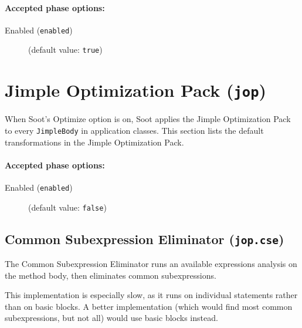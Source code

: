 \documentclass{article}
\begin{document}
\paragraph{Accepted phase options:} 

\begin{description}

\item[Enabled ({\tt enabled})]
(default value: {\tt true})






\end{description}

\section{Jimple Optimization Pack ({\tt jop})}

When Soot's Optimize option is on, Soot applies the
Jimple Optimization Pack to every {\tt JimpleBody} in
application classes.  This section lists the default
transformations in the Jimple Optimization Pack.


\paragraph{Accepted phase options:} 

\begin{description}

\item[Enabled ({\tt enabled})]
(default value: {\tt false})






\end{description}

\subsection{Common Subexpression Eliminator ({\tt jop.cse})}


\par

The Common Subexpression Eliminator runs an available expressions
analysis on the method body, then eliminates common
subexpressions.


\par

This implementation is especially slow, as it runs on individual
statements rather than on basic blocks.  A better implementation
(which would find most common subexpressions, but not all) would use
basic blocks instead.
\end{document}
